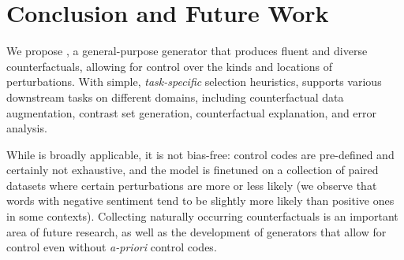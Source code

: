 \section{Conclusion and Future Work}
\label{sec:discuss}

We propose \sysname, a general-purpose generator that produces fluent and diverse counterfactuals, allowing for control over the kinds and locations of perturbations. 
With simple, \emph{task-specific} selection heuristics, \sysname supports various downstream tasks on different domains, including counterfactual data augmentation, contrast set generation, counterfactual explanation, and error analysis.

While \sysname is broadly applicable, it is not bias-free: control codes are pre-defined and certainly not exhaustive, and the model is finetuned on a collection of paired datasets where certain perturbations are more or less likely (\eg we observe that words with negative sentiment tend to be slightly more likely than positive ones in some contexts). 
Collecting naturally occurring counterfactuals is an important area of future research, as well as the development of generators that allow for control even without \emph{a-priori} control codes.


